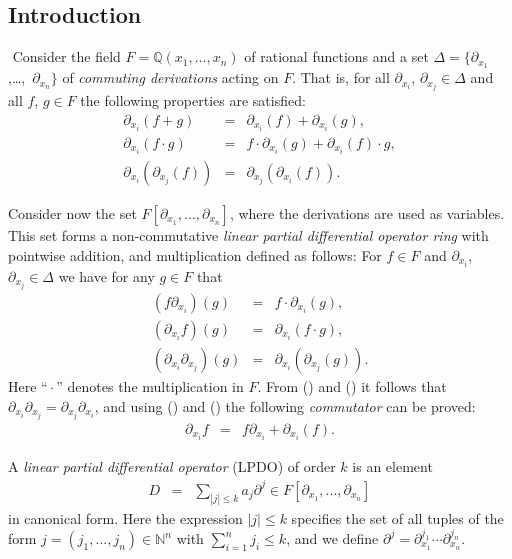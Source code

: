 \subsection{Introduction}
\ifdefined\VerbMath
\(
\newcommand{\Sym}{\operatorname{Sym}}
\)%
\else
\newcommand{\Sym}{\operatorname{Sym}}
\fi
Consider the field $F = \mathbb{Q}(x_1,\dots,x_n)$ of rational functions and a
set $\Delta = \{\partial_{x_1}$,\dots,~$\partial_{x_n}\}$ of
\emph{commuting derivations} acting on $F$. That is, for all
$\partial_{x_i}$, $\partial_{x_j} \in \Delta$ and all $f$, $g\in F$
the following properties are satisfied:
\begin{eqnarray}
\partial_{x_i}(f + g) &=& \partial_{x_i}(f) + \partial_{x_i}(g),\nonumber\\
\partial_{x_i}(f\cdot g) &=& f\cdot\partial_{x_i}(g)
  + \partial_{x_i}(f)\cdot g,\label{EQ:leibnitz}\\
\partial_{x_i}(\partial_{x_j}(f)) &=& \partial_{x_j}(\partial_{x_i}(f)).\label{EQ:comm}
\end{eqnarray}

Consider now the set $F[\partial_{x_1},\dots,\partial_{x_n}]$, where
the derivations are used as variables. This set forms a
non-commutative \emph{linear partial differential operator ring} with
pointwise addition, and multiplication defined as follows: For $f\in
F$ and $\partial_{x_i}$, $\partial_{x_j} \in \Delta$ we have for any
$g\in F$ that
\begin{eqnarray}
    (f \partial_{x_i})(g) &=& f \cdot \partial_{x_i}(g),\nonumber\\
    (\partial_{x_i} f)(g) &=& \partial_{x_i}(f \cdot g),\label{EQ:mult2}\\
    (\partial_{x_i} \partial_{x_j})(g) &=& \partial_{x_i}(\partial_{x_j}(g)).\label{EQ:mult3}
\end{eqnarray}
Here ``${}\cdot{}$'' denotes the multiplication in $F$. From
() and () it follows that
$\partial_{x_i} \partial_{x_j}=\partial_{x_j} \partial_{x_i}$, and
using () and () the following
\emph{commutator} can be proved:
\begin{eqnarray*}
  \partial_{x_i} f &=& f \partial_{x_i} + \partial_{x_i}(f).
\end{eqnarray*}

A \emph{linear partial differential operator} (LPDO) of order $k$ is
an element
\begin{eqnarray*}
  D &=& \sum_{|j| \leq k} a_j \partial^j\in
  F[\partial_{x_1},\dots,\partial_{x_n}]
\end{eqnarray*}
in canonical form. Here the expression $|j| \leq k$ specifies the set
of all tuples of the form $j = (j_1,\dots,j_n) \in \mathbb{N}^n$ with
$\sum_{i=1}^n j_i \leq k$, and we define $\partial^j
= \partial_{x_1}^{j_1} \cdots \partial_{x_n}^{j_n}$.

